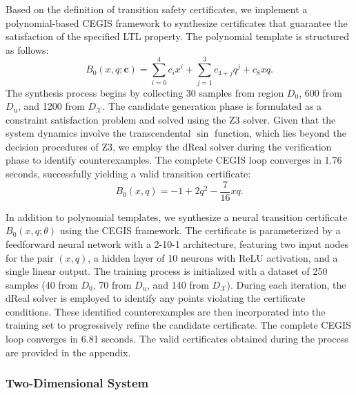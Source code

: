 Based on the definition of transition safety certificates, we implement a polynomial-based CEGIS framework to synthesize certificates that guarantee the satisfaction of the specified LTL property. The polynomial template is structured as follows:
\[
B_0(x, q; \mathbf{c}) = \sum_{i=0}^{4} c_i x^i + \sum_{j=1}^{3} c_{4+j} q^j + c_8 xq.
\]
The synthesis process begins by collecting 30 samples from region $D_0$, 600 from $D_u$, and 1200 from $D_{\mathcal{X}}$. The candidate generation phase is formulated as a constraint satisfaction problem and solved using the Z3 solver. Given that the system dynamics involve the transcendental $\sin$ function, which lies beyond the decision procedures of Z3, we employ the dReal solver during the verification phase to identify counterexamples. The complete CEGIS loop converges in 1.76 seconds, successfully yielding a valid transition certificate:
\[
B_0(x, q) = -1 + 2q^2 - \frac{7}{16}xq.
\]

In addition to polynomial templates, we synthesize a neural transition certificate $B_0(x, q; \theta)$ using the CEGIS framework. The certificate is parameterized by a feedforward neural network with a 2-10-1 architecture, featuring two input nodes for the pair $(x, q)$, a hidden layer of 10 neurons with ReLU activation, and a single linear output. The training process is initialized with a dataset of 250 samples (40 from $D_0$, 70 from $D_u$, and 140 from $D_{\mathcal{X}}$). During each iteration, the dReal solver is employed to identify any points violating the certificate conditions. These identified counterexamples are then incorporated into the training set to progressively refine the candidate certificate. The complete CEGIS loop converges in 6.81 seconds. The valid certificates obtained during the process are provided in the appendix.

\subsubsection{Two-Dimensional System}

